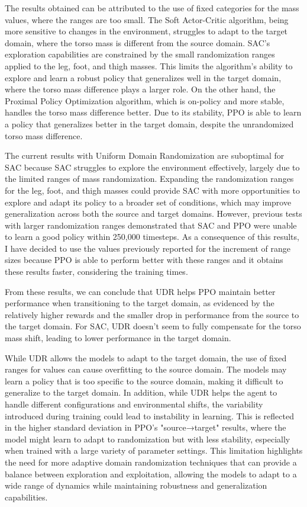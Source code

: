 \documentclass[12pt]{article}
\begin{document}
The results obtained can be attributed to the use of fixed categories for the mass values, where the ranges are too small. 
The Soft Actor-Critic algorithm, being more sensitive to changes in the environment, struggles to adapt to the target domain, where the torso mass is different from the source domain. SAC’s exploration capabilities are constrained by the small randomization ranges applied to the leg, foot, and thigh masses. This limits the algorithm's ability to explore and learn a robust policy that generalizes well in the target domain, where the torso mass difference plays a larger role.
On the other hand, the Proximal Policy Optimization algorithm, which is on-policy and more stable, handles the torso mass difference better. Due to its stability, PPO is able to learn a policy that generalizes better in the target domain, despite the unrandomized torso mass difference.

The current results with Uniform Domain Randomization are suboptimal for SAC because SAC struggles to explore the environment effectively, largely due to the limited ranges of mass randomization. Expanding the randomization ranges for the leg, foot, and thigh masses could provide SAC with more opportunities to explore and adapt its policy to a broader set of conditions, which may improve generalization across both the source and target domains. However, previous tests with larger randomization ranges demonstrated that SAC and PPO were unable to learn a good policy within 250,000 timesteps. As a consequence of this results, I have decided to use the values previously reported for the increment of range sizes because PPO is able to perform better with these ranges and it obtains these results faster, considering the training times. 

From these results, we can conclude that UDR helps PPO maintain better performance when transitioning to the target domain, as evidenced by the relatively higher rewards and the smaller drop in performance from the source to the target domain. For SAC, UDR doesn't seem to fully compensate for the torso mass shift, leading to lower performance in the target domain.

While UDR allows the models to adapt to the target domain, the use of fixed ranges for values can cause overfitting to the source domain. The models may learn a policy that is too specific to the source domain, making it difficult to generalize to the target domain. In addition, while UDR helps the agent to handle different configurations and environmental shifts, the variability introduced during training could lead to instability in learning. This is reflected in the higher standard deviation in PPO’s "source→target" results, where the model might learn to adapt to randomization but with less stability, especially when trained with a large variety of parameter settings. This limitation highlights the need for more adaptive domain randomization techniques that can provide a balance between exploration and exploitation, allowing the models to adapt to a wide range of dynamics while maintaining robustness and generalization capabilities.
\end{document}
